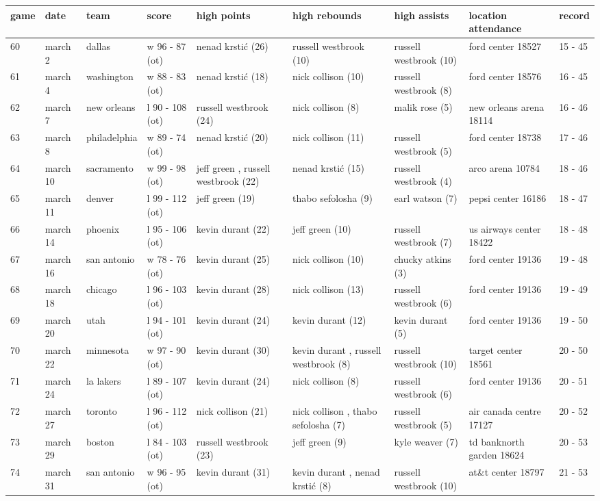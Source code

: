 \documentclass{article}
\begin{document}
\begin{tabular}{lllllllll}
\toprule
game & date & team & score & high points & high rebounds & high assists & location attendance & record \\
\midrule
60 & march 2 & dallas & w 96 - 87 (ot) & nenad krstić (26) & russell westbrook (10) & russell westbrook (10) & ford center 18527 & 15 - 45 \\
61 & march 4 & washington & w 88 - 83 (ot) & nenad krstić (18) & nick collison (10) & russell westbrook (8) & ford center 18576 & 16 - 45 \\
62 & march 7 & new orleans & l 90 - 108 (ot) & russell westbrook (24) & nick collison (8) & malik rose (5) & new orleans arena 18114 & 16 - 46 \\
63 & march 8 & philadelphia & w 89 - 74 (ot) & nenad krstić (20) & nick collison (11) & russell westbrook (5) & ford center 18738 & 17 - 46 \\
64 & march 10 & sacramento & w 99 - 98 (ot) & jeff green , russell westbrook (22) & nenad krstić (15) & russell westbrook (4) & arco arena 10784 & 18 - 46 \\
65 & march 11 & denver & l 99 - 112 (ot) & jeff green (19) & thabo sefolosha (9) & earl watson (7) & pepsi center 16186 & 18 - 47 \\
66 & march 14 & phoenix & l 95 - 106 (ot) & kevin durant (22) & jeff green (10) & russell westbrook (7) & us airways center 18422 & 18 - 48 \\
67 & march 16 & san antonio & w 78 - 76 (ot) & kevin durant (25) & nick collison (10) & chucky atkins (3) & ford center 19136 & 19 - 48 \\
68 & march 18 & chicago & l 96 - 103 (ot) & kevin durant (28) & nick collison (13) & russell westbrook (6) & ford center 19136 & 19 - 49 \\
69 & march 20 & utah & l 94 - 101 (ot) & kevin durant (24) & kevin durant (12) & kevin durant (5) & ford center 19136 & 19 - 50 \\
70 & march 22 & minnesota & w 97 - 90 (ot) & kevin durant (30) & kevin durant , russell westbrook (8) & russell westbrook (10) & target center 18561 & 20 - 50 \\
71 & march 24 & la lakers & l 89 - 107 (ot) & kevin durant (24) & nick collison (8) & russell westbrook (6) & ford center 19136 & 20 - 51 \\
72 & march 27 & toronto & l 96 - 112 (ot) & nick collison (21) & nick collison , thabo sefolosha (7) & russell westbrook (5) & air canada centre 17127 & 20 - 52 \\
73 & march 29 & boston & l 84 - 103 (ot) & russell westbrook (23) & jeff green (9) & kyle weaver (7) & td banknorth garden 18624 & 20 - 53 \\
74 & march 31 & san antonio & w 96 - 95 (ot) & kevin durant (31) & kevin durant , nenad krstić (8) & russell westbrook (10) & at\&t center 18797 & 21 - 53 \\
\bottomrule
\end{tabular}
\end{document}
